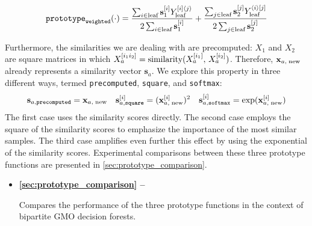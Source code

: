 \begin{equation}
    \texttt{prototype}_\texttt{weighted}(\cdot)
    = \frac{
        \sum_{i\in \text{leaf}}
            \mathbf{s}_1^{[i]}
            Y_\text{leaf}^{[i]\langle j\rangle}
    }{
        2\sum_{i\in \text{leaf}}
            \mathbf{s}_{1}^{[i]}
    }
    +
    \frac{
        \sum_{j\in \text{leaf}}
            \mathbf{s}_{2}^{[j]}
            Y_\text{leaf}^{\langle i\rangle[j]}
    }{
        2\sum_{j\in \text{leaf}}
            \mathbf{s}_{2}^{[j]}
    }
    \label{eq:prototype3}
\end{equation}

Furthermore, the similarities we are dealing with are precomputed: $X_1$ and $X_2$ are square matrices in which $X_a^{[i_1i_2]} = \text{similarity}(X_a^{[i_1]},\, X_a ^{[i_2]})$. Therefore, $\mathbf{x}_{a,\;\text{new}}$ already represents a similarity vector $\mathbf{s}_a$. We explore this property in three different ways, termed \texttt{precomputed}, \texttt{square}, and \texttt{softmax}:
\begin{align}
   \mathbf{s}_{a,\texttt{precomputed}} = \mathbf{x}_{a,\;\text{new}} &&
   \mathbf{s}_{a,\texttt{square}}^{[i]} = (\mathbf{x}_{a,\;\text{new}}^{[i]})^2 &&
   \mathbf{s}_{a,\texttt{softmax}}^{[i]} = \exp(\mathbf{x}_{a,\;\text{new}}^{[i]})
\end{align}
%
%
%
The first case uses the similarity scores directly. The second case employs the square of the similarity scores to emphasize the importance of the most similar samples. The third case amplifies even further this effect by using the exponential of the similarity scores.
Experimental comparisons between these three prototype functions are presented in \autoref{sec:prototype_comparison}.

\begin{mdframed}[frametitle={Related experiments}]

   \begin{itemize}
    \item \textbf{\autoref{sec:prototype_comparison} -- }

    Compares the performance of the three prototype functions in the context of bipartite GMO decision forests.

   \end{itemize}
\end{mdframed}

